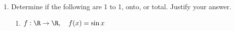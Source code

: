 \documentclass[basic, header]{nosvagor-notes}
\begin{document}
\begin{enumerate}
  \item Determine if the following are 1 to 1, onto, or total. Justify your answer.
  \begin{enumerate}[leftmargin=2em]
    \item \(f : \R \to \R, \quad f(x) = \sin x\)

  \end{enumerate}

\end{enumerate}
\end{document}
